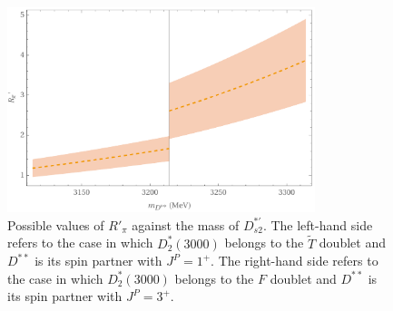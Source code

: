 \begin{figure}
  \center
  \includegraphics[width=0.8\textwidth]{figures/plot.pdf}
  \caption{Possible values of $R'_\pi$ against the mass of $D^{* \prime}_{s 2}$. The left-hand side refers to the case in which $D^*_2(3000)$ belongs to the $\tilde{T}$ doublet and $D^{**}$ is its spin partner with $J^P=1^+$. The right-hand side refers to the case in which $D_2^*(3000)$ belongs to the $F$ doublet and $D^{**}$ is its spin partner with $J^P=3^+$.}
  \label{fig:R'pi}
\end{figure}

